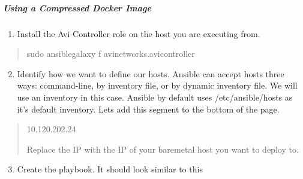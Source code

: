 \documentclass[letterpaper,10pt,english]{sphinxmanual}
\begin{document}
\subparagraph{Using a Compressed Docker Image}
\label{\detokenize{integrations/ansible/controller:using-a-compressed-docker-image}}
\begin{enumerate}
\item {} 
Install the Avi Controller role on the host you are executing from.

\end{enumerate}
\begin{quote}

\begin{sphinxVerbatim}[commandchars=\\\{\}]
sudo ansible\PYGZhy{}galaxy \PYGZhy{}f avinetworks.avicontroller
\end{sphinxVerbatim}
\end{quote}
\begin{enumerate}
\setcounter{enumi}{1}
\item {} 
Identify how we want to define our hosts. Ansible can accept hosts three ways: command-line, by inventory file, or by dynamic inventory file. We will use an inventory in this case. Ansible by default uses /etc/ansible/hosts as it's default inventory. Lets add this segment to the bottom of the page.

\end{enumerate}
\begin{quote}

\begin{sphinxVerbatim}[commandchars=\\\{\}]
[avicontrollers]
10.120.202.24
\end{sphinxVerbatim}

Replace the IP with the IP of your baremetal host you want to deploy to.
\end{quote}
\begin{enumerate}
\setcounter{enumi}{2}
\item {} 
Create the playbook. It should look similar to this

\end{enumerate}
\end{document}
